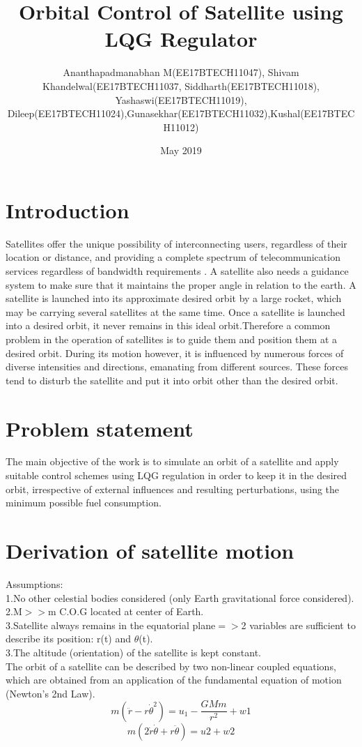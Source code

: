 \documentclass[journal,onecolumn]{IEEEtran}
\title{Orbital Control of Satellite using LQG Regulator}
\author{Ananthapadmanabhan M(EE17BTECH11047), Shivam Khandelwal(EE17BTECH11037, Siddharth(EE17BTECH11018), Yashaswi(EE17BTECH11019), Dileep(EE17BTECH11024),Gunasekhar(EE17BTECH11032),Kushal(EE17BTECH11012)}
\date{May 2019}
\begin{document}
\maketitle
\section{Introduction}
Satellites offer the unique possibility of interconnecting users, regardless of their location or distance, and providing a complete spectrum of telecommunication services regardless of bandwidth requirements . A satellite also needs a guidance system to make sure that it maintains the proper angle in relation to the earth. A satellite is launched into its approximate desired orbit by a large rocket, which may be carrying several satellites at the same time. Once a satellite is launched into a desired orbit, it never remains in this ideal orbit.Therefore a common problem in the operation of satellites is to guide them and position them at a desired orbit. During its motion however, it is influenced by numerous forces of diverse intensities and directions, emanating from different sources. These forces tend to disturb the satellite and put it into orbit other than the desired orbit.
\section{Problem statement}
The main objective of the work is to simulate an orbit of a satellite and apply suitable control schemes using LQG regulation in order to keep it in the desired orbit, irrespective of external influences and resulting perturbations, using the minimum possible fuel consumption.
\section{Derivation of satellite motion}
Assumptions:\\
1.No other celestial bodies considered (only Earth gravitational force considered).\\
2.M$>>$m C.O.G located at center of Earth.\\
3.Satellite always remains in the equatorial plane$=>$2 variables are sufficient to describe its position: r(t) and $\theta$(t).\\
3.The altitude (orientation) of the satellite is kept constant.\\
The orbit of a satellite can be described by two non-linear coupled equations, which are obtained from an application of the fundamental equation of motion (Newton’s 2nd Law). \\
\begin{equation}m(\ddot{r}-r\dot\theta^2)=u_1-\frac{GMm}{r^2}+w1\end{equation}
\begin{equation}m(2\dot{r}\dot\theta+r\ddot\theta)=u2+w2\end{equation}
\end{document}
